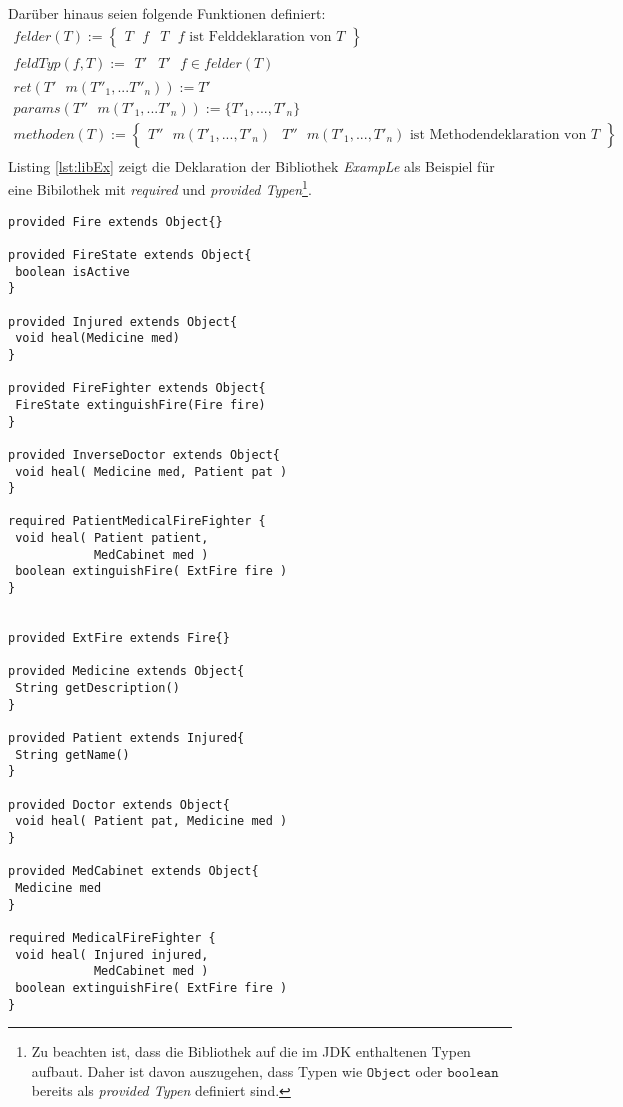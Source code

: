\noindent
Darüber hinaus seien folgende Funktionen definiert:
\begin{gather*}
\mathit{felder(T)} :=  \left\{ 
				\begin{array}{l|l}
					T \texttt{ }\mathit{f} & T \texttt{ }\mathit{f}\text{ ist Felddeklaration von }T
				\end{array}
              \right\}
\\
\mathit{feldTyp(f,T)} := 
				\begin{array}{l|l}
					T' & T' \texttt{ }\mathit{f} \in \mathit{felder(T)}
				\end{array}   
\\
\mathit{ret(T'\text{ }m(T''_1,...T''_n))} := T'
\\
\mathit{params(T''\text{ }m(T'_1,...T'_n))} := \{ T'_1,...,T'_n \}
\\   
\mathit{methoden(T)} := \left\{ 
				\begin{array}{l|l}
					T'' \text{ }m(T'_1,...,T'_n) & T'' \text{ }m(T'_1,...,T'_n) \text{ ist Methodendeklaration von }T
				\end{array}
              \right\}
\\        
\end{gather*}
\noindent
Listing \ref{lst:libEx} zeigt die Deklaration der Bibliothek \emph{ExampLe} als Beispiel für eine Bibilothek mit \emph{required} und \emph{provided Typen}\footnote{Zu beachten ist, dass die Bibliothek auf die im JDK enthaltenen Typen aufbaut. Daher ist davon auszugehen, dass Typen wie $\texttt{Object}$ oder $\texttt{boolean}$ bereits als \emph{provided Typen} definiert sind.}.
\noindent
\begin{multicols}{2}
\begin{lstlisting}[caption={Bibliothek \emph{ExampLe} von Typen},captionpos=b, style = dsl, label=lst:libEx]
provided Fire extends Object{}

provided FireState extends Object{
 boolean isActive
}

provided Injured extends Object{
 void heal(Medicine med)	
}

provided FireFighter extends Object{
 FireState extinguishFire(Fire fire)
}

provided InverseDoctor extends Object{	
 void heal( Medicine med, Patient pat )
}

required PatientMedicalFireFighter {
 void heal( Patient patient, 
            MedCabinet med )
 boolean extinguishFire( ExtFire fire )	
}


provided ExtFire extends Fire{}

provided Medicine extends Object{
 String getDescription()
}

provided Patient extends Injured{
 String getName()
}

provided Doctor extends Object{	
 void heal( Patient pat, Medicine med )
}

provided MedCabinet extends Object{
 Medicine med
}

required MedicalFireFighter {
 void heal( Injured injured, 
            MedCabinet med )
 boolean extinguishFire( ExtFire fire )	
}
\end{lstlisting}
\end{multicols}
\noindent

